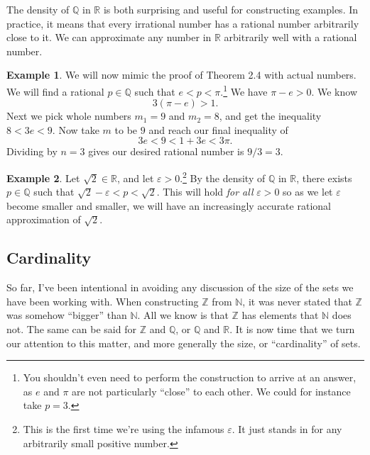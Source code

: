 \documentclass{article}
\newcommand{\N}{\mathbb{N}}
\newcommand{\R}{\mathbb{R}}
\newcommand{\Q}{\mathbb{Q}}
\newcommand{\Z}{\mathbb{Z}}
\theoremstyle{definition}
\newtheorem{example}{Example}[section]
\begin{document}
The density of $ \Q $ in $ \R $ is both surprising and useful for constructing examples. In practice, it means that every irrational number has a rational number arbitrarily close to it. We can approximate any number in $ \R $ arbitrarily well with a rational number.
\begin{example}
We will now mimic the proof of Theorem 2.4 with actual numbers. We will find a rational $ p\in\Q $ such that $ e<p<\pi $.\footnote{You shouldn't even need to perform the construction to arrive at an answer, as $ e $ and $ \pi $ are not particularly ``close'' to each other. We could for instance take $ p=3 $. } We have $ \pi-e>0 $. We know $$ 3(\pi-e)>1 .$$ Next we pick whole numbers $ m_1=9 $ and $ m_2=8 $, and get the inequality $ 8<3e<9 $. Now take $ m $ to be $ 9 $ and reach our final inequality of $$ 3e<9<1+3e <3\pi.$$ Dividing by $ n=3 $ gives our desired rational number is $ 9/3=3 $.  
\end{example}
\begin{example}
	Let $ \sqrt{2}\in\R $, and let $ \varepsilon>0 $.\footnote{This is the first time we're using the infamous $ \varepsilon $. It just stands in for any arbitrarily small positive number.} By the density of $ \Q $ in $ \R $, there exists $ p\in\Q $ such that $ \sqrt{2}-\varepsilon<p<\sqrt{2} $. This will hold \textit{for all} $ \varepsilon>0 $ so as we let $ \varepsilon $ become smaller and smaller, we will have an increasingly accurate rational approximation of $ \sqrt{2} $.
\end{example}     
\subsection{Cardinality}
So far, I've been intentional in avoiding any discussion of the size of the sets we have been working with. When constructing $ \Z $ from $ \N $, it was never stated that $ \Z $ was somehow ``bigger'' than $ \N $. All we know is that $ \Z $ has elements that $ \N $ does not. The same can be said for $ \Z $ and $ \Q $, or $ \Q $ and $ \R $. It is now time that we turn our attention to this matter, and more generally the size, or ``cardinality'' of sets. 
\end{document}
